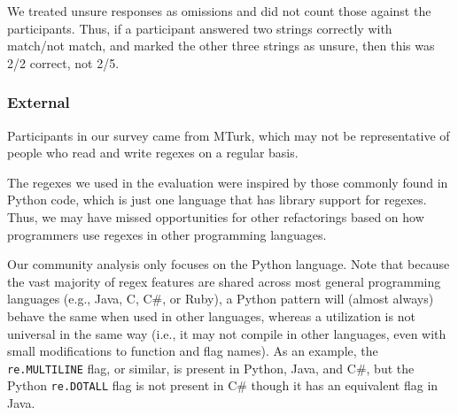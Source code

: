 
We treated unsure responses as omissions and did not count those against the participants. Thus, if a participant answered two strings correctly with match/not match, and marked the other three strings as unsure, then this was 2/2 correct, not 2/5.

\subsubsection{External}
Participants in our survey came from MTurk, which may not be representative of people who read and write regexes on a regular basis.

The regexes we used in the evaluation were inspired by those commonly found in Python code, which is just one language that has library support for regexes. Thus, we may have missed opportunities for other refactorings based on how programmers use regexes in other programming languages.

Our community analysis only focuses on the Python language. Note that because the vast majority of regex features are shared across most general programming languages (e.g., Java, C, C\#, or Ruby), a Python {pattern} will (almost always) behave the same when used in other languages, whereas a utilization is not universal in the same way (i.e., it may not compile in other languages, even with small modifications to function and flag names).
As an example, the {\tt re.MULTILINE} flag, or similar, is present in Python, Java, and C\#, but  the Python {\tt re.DOTALL} flag is not present in C\# though it has an equivalent flag in Java.
